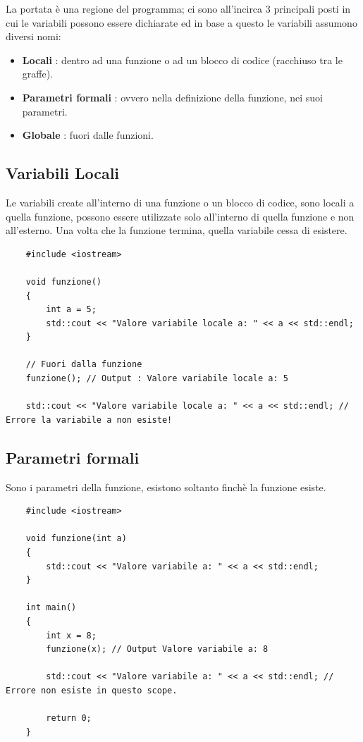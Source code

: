 \textsf{\small La portata è una regione del programma; ci sono all'incirca 3 principali posti in cui le variabili possono essere dichiarate ed in base a questo le variabili assumono diversi nomi: }

\begin{itemize}
	\item \textsf{\small \textbf{Locali} : dentro ad una funzione o ad un blocco di codice (racchiuso tra le graffe).}
	\item \textsf{\small \textbf{Parametri formali} : ovvero nella definizione della funzione, nei suoi parametri.}
	\item \textsf{\small \textbf{Globale} : fuori dalle funzioni.}
\end{itemize}

\subsection{Variabili Locali}

\textsf{\small Le variabili create all'interno di una funzione o un blocco di codice, sono locali a quella funzione, possono essere utilizzate solo all'interno di quella funzione e non all'esterno. Una volta che la funzione termina, quella variabile cessa di esistere.} \\

\begin{lstlisting}
	#include <iostream>
	
	void funzione()
	{
		int a = 5;
		std::cout << "Valore variabile locale a: " << a << std::endl;
	}
	
	// Fuori dalla funzione
	funzione(); // Output : Valore variabile locale a: 5
	
	std::cout << "Valore variabile locale a: " << a << std::endl; // Errore la variabile a non esiste!
\end{lstlisting}

\subsection{Parametri formali}

\textsf{\small Sono i parametri della funzione, esistono soltanto finchè la funzione esiste.} \\

\begin{lstlisting}
	#include <iostream>
	
	void funzione(int a)
	{
		std::cout << "Valore variabile a: " << a << std::endl;
	}
	
	int main()
	{
		int x = 8;
		funzione(x); // Output Valore variabile a: 8
		
		std::cout << "Valore variabile a: " << a << std::endl; // Errore non esiste in questo scope.
		
		return 0;
	}
\end{lstlisting}

